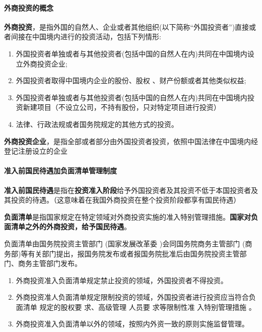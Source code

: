 \documentclass[UTF8,12pt]{ctexart}
\numberwithin{equation}{section} %
\numberwithin{figure}{section}
\numberwithin{table}{section}
\begin{document}
	\paragraph{外商投资的概念}
	
	\textbf{外商投资}，是指外国的自然人、企业或者其他组织(以下简称“外国投资者”)直接或者间接在中国境内进行的投资活动，包括下列情形:
	\begin{enumerate}
		\item 外国投资者单独或者与其他投资者(包括中国的自然人在内)共同在中国境内设立外商投资企业;
		
		\item 外国投资者取得中国境内企业的股份、股权 、财产份额或者其他类似权益;
		
		\item 外国投资者单独或者与其他投资者(包括中国的自然人在内)共同在中国境内投资新建项目（不设立公司，不持有股份，只对特定项目进行投资）
		
		\item 法律、行政法规或者国务院规定的其他方式的投资。
	\end{enumerate}

	\textbf{外商投资企业}，是指全部或者部分由外国投资者投资，依照中国法律在中国境内经登记注册设立的企业
	
	\paragraph{准入前国民待遇加负面清单管理制度}
	\textbf{准入前国民待遇}是指在\textbf{投资准入阶段}给予外国投资者及其投资不低于本国投资者及其投资的待遇。（这意味着在我国外商投资在整个投资阶段都享有国民待遇）
	
	 \textbf{负面清单}是指国家规定在特定领域对外商投资实施的准入特别管理措施。\textbf{国家对负面清单之外的外商投资，给予国民待遇}。
	 
	 负面清单由国务院投资主管部门 (国家发展改革委 )会同国务院商务主管部门 (商务部)等有关部门提出，报国务院发布或者报国务院批准后由国务院投资主管部门、商务主管部门发布。
	 \begin{enumerate}
	 	\item 外商投资准入负面清单规定禁止投资的领域，外国投资者不得投资。
	 	
	 	\item 外商投资准人负面清单规定限制投资的领域，外国投资者进行投资应当符合负面清单 规定的股权要 求、高级管理 人员要 求等限制性准 入特别管理措施 。
	 	
	 	\item 外商投资准入负面清单以外的领域，按照内外资一致的原则实施监督管理。
	 \end{enumerate}
	
\end{document}

